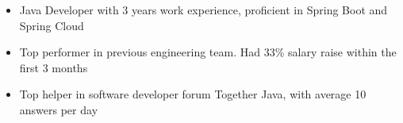\begin{itemize}
    \item Java Developer with 3 years work experience, proficient in Spring Boot and Spring Cloud
    \item Top performer in previous engineering team. Had 33\% salary raise within the first 3 months
    \item Top helper in software developer forum Together Java, with average 10 answers per day
\end{itemize}